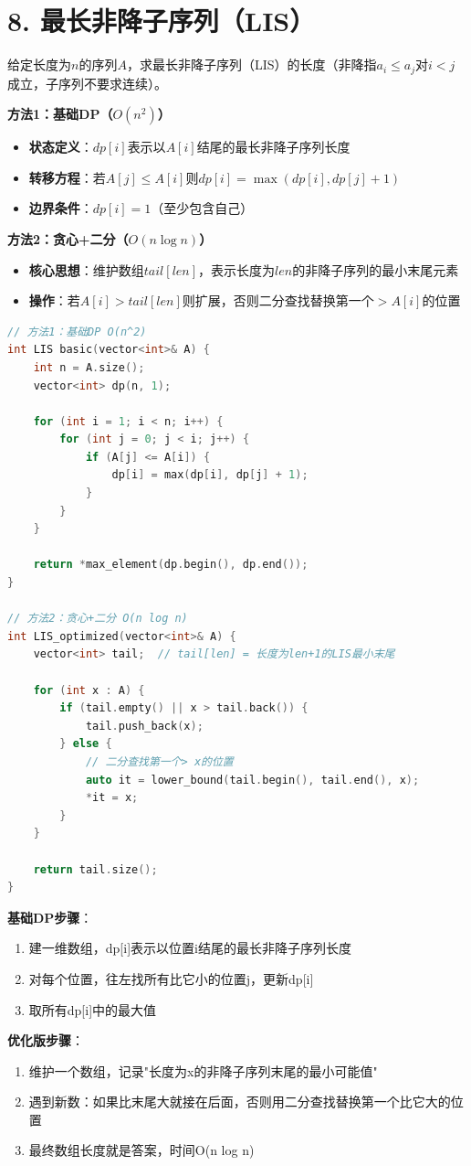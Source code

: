 \section*{8. 最长非降子序列（LIS）}

给定长度为$n$的序列$A$，求最长非降子序列（LIS）的长度（非降指$a_i \le a_j$对$i < j$成立，子序列不要求连续）。

\textbf{方法1：基础DP（$O(n^2)$）}
\begin{itemize}
    \item \textbf{状态定义}：$dp[i]$表示以$A[i]$结尾的最长非降子序列长度
    \item \textbf{转移方程}：若$A[j] \le A[i]$则$dp[i] = \max(dp[i], dp[j] + 1)$
    \item \textbf{边界条件}：$dp[i] = 1$（至少包含自己）
\end{itemize}

\textbf{方法2：贪心+二分（$O(n \log n)$）}
\begin{itemize}
    \item \textbf{核心思想}：维护数组$tail[len]$，表示长度为$len$的非降子序列的最小末尾元素
    \item \textbf{操作}：若$A[i] > tail[len]$则扩展，否则二分查找替换第一个$> A[i]$的位置
\end{itemize}

\begin{lstlisting}[language=C++, style=cppstyle]
// 方法1：基础DP O(n^2)
int LIS basic(vector<int>& A) {
    int n = A.size();
    vector<int> dp(n, 1);

    for (int i = 1; i < n; i++) {
        for (int j = 0; j < i; j++) {
            if (A[j] <= A[i]) {
                dp[i] = max(dp[i], dp[j] + 1);
            }
        }
    }

    return *max_element(dp.begin(), dp.end());
}

// 方法2：贪心+二分 O(n log n)
int LIS_optimized(vector<int>& A) {
    vector<int> tail;  // tail[len] = 长度为len+1的LIS最小末尾

    for (int x : A) {
        if (tail.empty() || x > tail.back()) {
            tail.push_back(x);
        } else {
            // 二分查找第一个> x的位置
            auto it = lower_bound(tail.begin(), tail.end(), x);
            *it = x;
        }
    }

    return tail.size();
}
\end{lstlisting}

\textbf{基础DP步骤}：
\begin{enumerate}
    \item 建一维数组，dp[i]表示以位置i结尾的最长非降子序列长度
    \item 对每个位置，往左找所有比它小的位置j，更新dp[i]
    \item 取所有dp[i]中的最大值
\end{enumerate}

\textbf{优化版步骤}：
\begin{enumerate}
    \item 维护一个数组，记录"长度为x的非降子序列末尾的最小可能值"
    \item 遇到新数：如果比末尾大就接在后面，否则用二分查找替换第一个比它大的位置
    \item 最终数组长度就是答案，时间O(n log n)
\end{enumerate}
